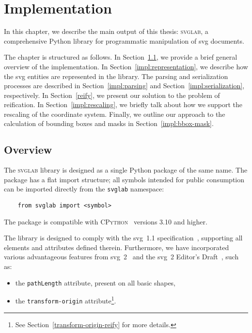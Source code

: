 \chapter{Implementation}\label{chap:implementation}

In this chapter, we describe the main output of this thesis: \textsc{svglab}, a comprehensive Python library for programmatic manipulation of \gls{svg} documents.

The chapter is structured as follows. In Section~\ref{impl:overview}, we provide a brief general overview of the implementation. In Section~\ref{impl:representation}, we describe how the \gls{svg} entities are represented in the library. The parsing and serialization processes are described in Section~\ref{impl:parsing} and Section~\ref{impl:serialization}, respectively. In Section~\ref{reify}, we present our solution to the problem of reification. In Section~\ref{impl:rescaling}, we briefly talk about how we support the rescaling of the coordinate system. Finally, we outline our approach to the calculation of bounding boxes and masks in Section~\ref{impl:bbox-mask}.

\section{Overview}\label{impl:overview}

The \textsc{svglab} library is designed as a single Python package of the same name. The package has a flat import structure; all symbols intended for public consumption can be imported directly from the \texttt{svglab} namespace:
\begin{verbatim}
    from svglab import <symbol>
\end{verbatim}

The package is compatible with \textsc{CPython}~\cite{python-downloads} versions 3.10 and higher.

The library is designed to comply with the \gls{svg}~1.1 specification~\cite{svg11}, supporting all elements and attributes defined therein. Furthermore, we have incorporated various advantageous features from \gls{svg}~2~\cite{svg2} and the \gls{svg}~2 Editor's Draft~\cite{svg2-draft}, such as:
\begin{itemize}
    \item the \texttt{pathLength} attribute, present on all basic shapes,
    \item the \texttt{transform-origin} attribute\footnote{See Section~\ref{transform-origin-reify} for more details.}.
\end{itemize}

